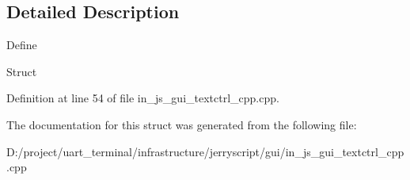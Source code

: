\subsection{Detailed Description}
Define

Struct 

Definition at line 54 of file in\+\_\+js\+\_\+gui\+\_\+textctrl\+\_\+cpp.\+cpp.



The documentation for this struct was generated from the following file\+:\begin{DoxyCompactItemize}
\item 
D\+:/project/uart\+\_\+terminal/infrastructure/jerryscript/gui/in\+\_\+js\+\_\+gui\+\_\+textctrl\+\_\+cpp.\+cpp\end{DoxyCompactItemize}
